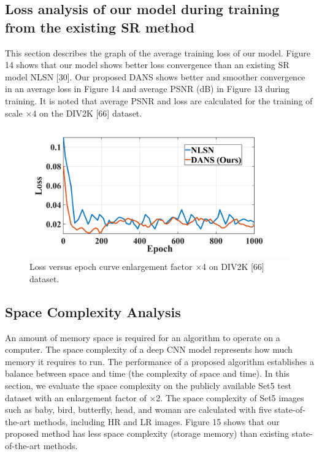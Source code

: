 \documentclass{ieeeaccess}
\begin{document}
\subsection{Loss analysis of our model during training from the existing SR method}
This section describes the graph of the average training loss of our model. Figure 14 shows that our model shows better loss convergence than an existing SR model NLSN [30]. Our proposed DANS shows better and smoother convergence in an average loss in Figure 14 and average PSNR (dB) in Figure 13 during training. It is noted that average PSNR and loss are calculated for the training of scale $\times4$ on the DIV2K [66] dataset.

\begin{figure}[ht]
  \includegraphics[width=\linewidth]{14FIGURE.png}
  \caption{Loss versus epoch curve enlargement factor $\times$4 on DIV2K [66] dataset.}
  \label{fig:14}
\end{figure}

\subsection{Space Complexity Analysis}

An amount of memory space is required for an algorithm to operate on a computer. The space complexity of a deep CNN model represents how much memory it requires to run. The performance of a proposed algorithm establishes a balance between space and time (the complexity of space and time). In this section, we evaluate the space complexity on the publicly available Set5 test dataset with an enlargement factor of $\times$2. The space complexity of Set5 images such as baby, bird, butterfly, head, and woman are calculated with five state-of-the-art methods, including HR and LR images. Figure 15 shows that our proposed method has less space complexity (storage memory) than existing state-of-the-art methods.
\end{document}
